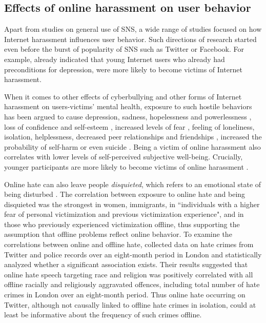 \documentclass[a4paper,fleqn]{cas-dc}
\begin{document}
\subsection{Effects of online harassment on user behavior}

Apart from studies on general use of SNS, a wide range of studies focused on how Internet harassment influences user behavior. Such directions of research started even before
the burst of popularity of SNS such as Twitter or Facebook. For example, \citet{ybarra2004linkages} already indicated that young Internet users who already had preconditions for 
depression,
were more likely to become victims of Internet harassment.

When it comes to other effects of cyberbullying and other forms of Internet harassment on users-victims' mental health, exposure to such hostile behaviors has been argued to cause depression, sadness, hopelessness and powerlessness \citep{raskauskas2007involvement}, loss of confidence and self-esteem \citep{cross2012virtual}, increased levels of fear  \citep{sourander2010psychosocial}, feeling of loneliness, isolation, helplessness, decreased peer relationships and friendships \citep{nixon2014current}, increased the probability of  self-harm or even suicide \citep{cross2012virtual}.
Being a victim of online harassment also correlates with lower levels of self-perceived subjective well-being. Crucially, younger participants are more likely to become victims of online harassment \citep{nasi2014association}.

Online hate can also leave people \textit{disquieted}, which refers to an emotional state of being disturbed \citep{savimaki2020disquieted}. The correlation between exposure to online hate and being disquieted was the strongest 
in women, immigrants, 
in ``individuals with a higher fear of personal victimization and previous victimization experience", and in those who previously experienced victimization offline, thus supporting the assumption that offline problems reflect online behavior. 
To
examine the correlations between online and offline hate, \citet{williams2020hate} collected data on hate crimes from Twitter and police records over an eight-month period in London and statistically analyzed whether
a significant association exists. Their results suggested that online hate speech targeting race and religion was positively correlated with all offline racially and religiously aggravated offences, including total number of hate crimes in London over an eight-month period. Thus online hate occurring on Twitter, although not causally linked to offline hate crimes in isolation, could at least be informative about the frequency of such crimes offline.
\end{document}
